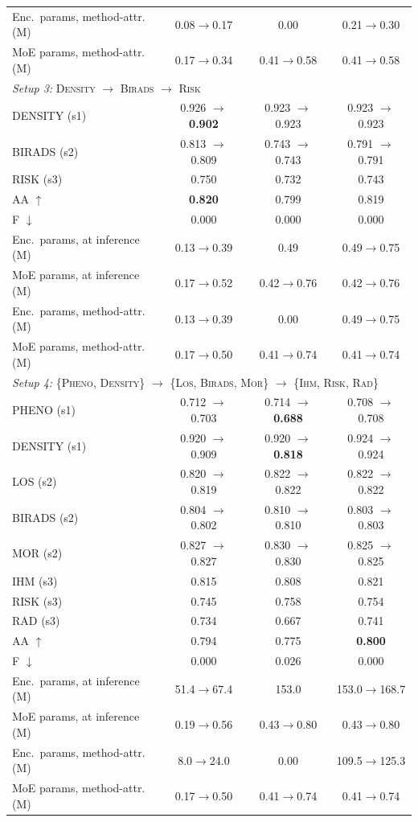\begin{table}[t]
\begin{tabular}{lccc}
Enc.\ params, method-attr. (M) & 0.08$\to$0.17 & 0.00 & 0.21$\to$0.30 \\
MoE params, method-attr. (M) & 0.17$\to$0.34 & 0.41$\to$0.58 & 0.41$\to$0.58 \\
\midrule
\multicolumn{4}{l}{\emph{Setup 3:} \textsc{Density} $\to$ \textsc{Birads} $\to$ \textsc{Risk}} \\
\addlinespace[1pt]
DENSITY (s1) & 0.926 $\to$ \textbf{0.902} & 0.923 $\to$ 0.923 & 0.923 $\to$ 0.923 \\
BIRADS (s2) & 0.813 $\to$ 0.809 & 0.743 $\to$ 0.743 & 0.791 $\to$ 0.791 \\
RISK (s3) & 0.750 & 0.732 & 0.743 \\
\addlinespace[1pt]
AA $\uparrow$ & \textbf{0.820} & 0.799 & 0.819 \\
F $\downarrow$ & 0.000 & 0.000 & 0.000 \\
Enc.\ params, at inference (M) & 0.13$\to$0.39 & 0.49 & 0.49$\to$0.75 \\
MoE params, at inference (M) & 0.17$\to$0.52 & 0.42$\to$0.76 & 0.42$\to$0.76 \\
Enc.\ params, method-attr. (M) & 0.13$\to$0.39 & 0.00 & 0.49$\to$0.75 \\
MoE params, method-attr. (M) & 0.17$\to$0.50 & 0.41$\to$0.74 & 0.41$\to$0.74 \\
\midrule
\multicolumn{4}{l}{\emph{Setup 4:} \{\textsc{Pheno}, \textsc{Density}\} $\to$ \{\textsc{Los}, \textsc{Birads}, \textsc{Mor}\} $\to$ \{\textsc{Ihm}, \textsc{Risk}, \textsc{Rad}\}} \\
\addlinespace[1pt]
PHENO (s1) & 0.712 $\to$ 0.703 & 0.714 $\to$ \textbf{0.688} & 0.708 $\to$ 0.708 \\
DENSITY (s1) & 0.920 $\to$ 0.909 & 0.920 $\to$ \textbf{0.818} & 0.924 $\to$ 0.924 \\
LOS (s2) & 0.820 $\to$ 0.819 & 0.822 $\to$ 0.822 & 0.822 $\to$ 0.822 \\
BIRADS (s2) & 0.804 $\to$ 0.802 & 0.810 $\to$ 0.810 & 0.803 $\to$ 0.803 \\
MOR (s2) & 0.827 $\to$ 0.827 & 0.830 $\to$ 0.830 & 0.825 $\to$ 0.825 \\
IHM (s3) & 0.815 & 0.808 & 0.821 \\
RISK (s3) & 0.745 & 0.758 & 0.754 \\
RAD (s3) & 0.734 & 0.667 & 0.741 \\
\addlinespace[1pt]
AA $\uparrow$ & 0.794 & 0.775 & \textbf{0.800} \\
F $\downarrow$ & 0.000 & 0.026 & 0.000 \\
Enc.\ params, at inference (M) & 51.4$\to$67.4 & 153.0 & 153.0$\to$168.7 \\
MoE params, at inference (M) & 0.19$\to$0.56 & 0.43$\to$0.80 & 0.43$\to$0.80 \\
Enc.\ params, method-attr. (M) & 8.0$\to$24.0 & 0.00 & 109.5$\to$125.3 \\
MoE params, method-attr. (M) & 0.17$\to$0.50 & 0.41$\to$0.74 & 0.41$\to$0.74 \\
\bottomrule
\end{tabular}
\end{table}
